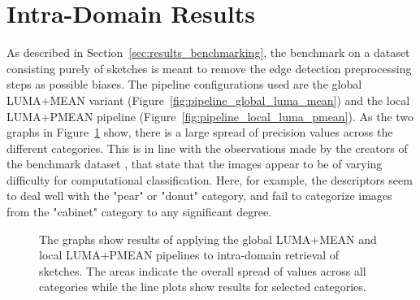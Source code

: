\section{Intra-Domain Results}\label{sec:intra_results}

As described in Section~\ref{sec:results_benchmarking}, the benchmark on a
dataset consisting purely of sketches is meant to remove the edge detection
preprocessing steps as possible biases. The pipeline configurations used are
the global LUMA+MEAN variant (Figure~\ref{fig:pipeline_global_luma_mean}) and
the local LUMA+PMEAN pipeline (Figure~\ref{fig:pipeline_local_luma_pmean}). As
the two graphs in Figure~\ref{fig:results_precision} show, there is a large
spread of precision values across the different categories. This is in line
with the observations made by the creators of the benchmark dataset
\autocite{eitz_how_2012}, that state that the images appear to be of varying
difficulty for computational classification. Here, for example, the descriptors
seem to deal well with the "pear" or "donut" category, and fail to categorize
images from the "cabinet" category to any significant degree.

\begin{figure}[h]
    \centering
    \quad
    \caption[Precision and Recall Results]{
        The graphs show results of applying the global LUMA+MEAN
         and local LUMA+PMEAN
         pipelines to
        intra-domain retrieval of sketches. The areas indicate the overall
        spread of values across all categories while the line plots show
        results for selected categories.
    }
    \label{fig:results_precision}
\end{figure}
